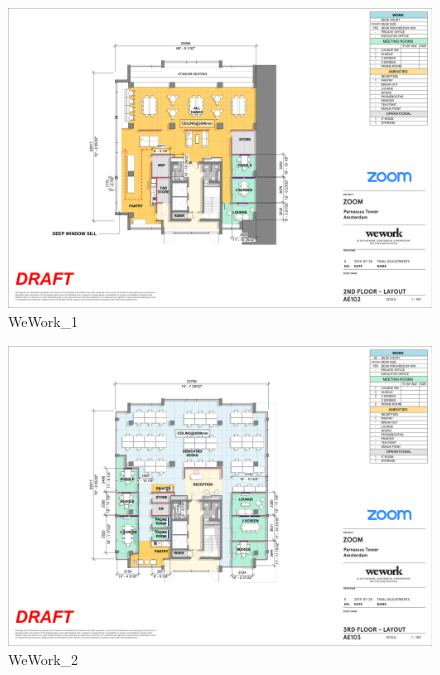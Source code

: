 \documentclass[
]{article}
\begin{document}
\begin{figure}[H]

{\centering \includegraphics{assets/WeWork/ww-parnassus-2.png}

}

\caption{WeWork\_1}

\end{figure}%
\begin{figure}[H]

{\centering \includegraphics{assets/WeWork/ww-parnassus-3.png}

}

\caption{WeWork\_2}

\end{figure}%
\end{document}
